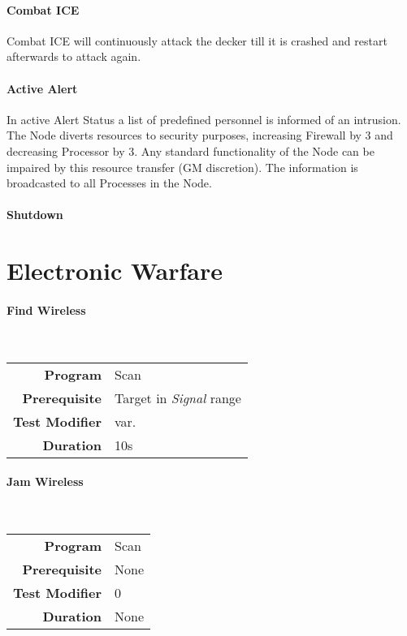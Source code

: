 \paragraph{Combat ICE} Combat ICE will continuously attack the decker till it
is crashed and restart afterwards to attack again.


\paragraph{Active Alert}

In active Alert Status a list of predefined personnel is informed of an intrusion.
The Node diverts resources to security purposes, increasing Firewall
by 3 and decreasing Processor by 3. Any standard functionality of the Node can
be impaired by this resource transfer (GM discretion).
The information is broadcasted to all Processes in the Node.

\paragraph{Shutdown}

\section{Electronic Warfare}

\paragraph{Find Wireless}
\label{par: find wireless}

\mbox{}\\

\begin{tabular}{rl}
    \textbf{Program}       & Scan                          \\
    \textbf{Prerequisite}  & Target in \emph{Signal} range \\
    \textbf{Test Modifier} & var.                          \\
    \textbf{Duration}      & 10s                           \\
\end{tabular}

\hfill

\paragraph{Jam Wireless}
\label{par: jam wireless}

\mbox{}\\

\begin{tabular}{rl}
    \textbf{Program}       & Scan \\
    \textbf{Prerequisite}  & None \\
    \textbf{Test Modifier} & 0    \\
    \textbf{Duration}      & None \\
\end{tabular}

\hfill
